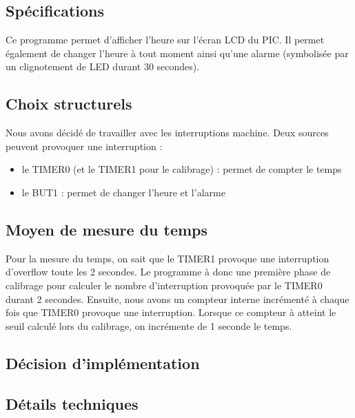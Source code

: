 \subsection*{Spécifications}

Ce programme permet d'afficher l'heure sur l'écran LCD du PIC. Il permet également de changer l'heure à tout moment ainsi qu'une alarme (symbolisée par un clignotement de LED durant 30 secondes).

\subsection*{Choix structurels}

Nous avons décidé de travailler avec les interruptions machine. Deux sources peuvent provoquer une interruption :
\begin{itemize}
	\item le TIMER0 (et le TIMER1 pour le calibrage) : permet de compter le temps
	\item le BUT1 : permet de changer l'heure et l'alarme 
\end{itemize}

\subsection*{Moyen de mesure du temps}

Pour la mesure du temps, on sait que le TIMER1 provoque une interruption d'overflow toute les 2 secondes. Le programme à donc une première phase de calibrage pour calculer le nombre d'interruption provoquée par le TIMER0 durant 2 secondes. Ensuite, nous avons un compteur interne incrémenté à chaque fois que TIMER0 provoque une interruption. Lorsque ce compteur à atteint le seuil calculé lors du calibrage, on incrémente de 1 seconde le temps.

\subsection*{Décision d'implémentation}


\subsection*{Détails techniques}


